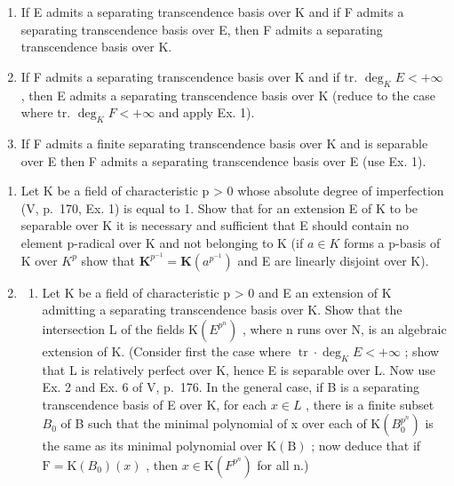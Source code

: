 \begin{enumerate}
\def\labelenumi{\alph{enumi})}
\item
  If E admits a separating transcendence basis over K and if F admits a separating transcendence basis over E, then F admits a separating transcendence basis over K.
\item
  If F admits a separating transcendence basis over K and if tr. \(\deg_{K}E<+\infty\) , then E admits a separating transcendence basis over K (reduce to the case where tr. \(\deg_{K}F<+\infty\) and apply Ex. 1).
\item
  If F admits a finite separating transcendence basis over K and is separable over E then F admits a separating transcendence basis over E (use Ex. 1).
\end{enumerate}

\begin{enumerate}
\def\labelenumi{\arabic{enumi})}
\setcounter{enumi}{3}
\item
  Let K be a field of characteristic p \textgreater{} 0 whose absolute degree of imperfection (V, p.~170, Ex. 1) is equal to 1. Show that for an extension E of K to be separable over K it is necessary and sufficient that E should contain no element p-radical over K and not belonging to K (if \(a \in K\) forms a p-basis of K over \(K^{p}\) show that \(\mathbf{K}^{p^{-1}} = \mathbf{K}(a^{p^{-1}})\) and E are linearly disjoint over K).
\item
  \begin{enumerate}
  \def\labelenumii{\alph{enumii})}
  \tightlist
  \item
    Let K be a field of characteristic p \textgreater{} 0 and E an extension of K admitting a separating transcendence basis over K. Show that the intersection L of the fields \(\mathrm{K}(E^{p^{n}})\) , where n runs over N, is an algebraic extension of K. (Consider first the case where \(\operatorname{tr} \cdot \deg_{K} E < +\infty\) ; show that L is relatively perfect over K, hence E is separable over L. Now use Ex. 2 and Ex. 6 of V, p.~176. In the general case, if B is a separating transcendence basis of E over K, for each \(x \in L\) , there is a finite subset \(B_{0}\) of B such that the minimal polynomial of x over each of \(\mathrm{K}(B_{0}^{p^{n}})\) is the same as its minimal polynomial over \(\mathrm{K(B)}\) ; now deduce that if \(\mathrm{F} = \mathrm{K}(B_{0})(x)\) , then \(x \in \mathrm{K}(F^{p^{n}})\) for all n.)
  \end{enumerate}
\end{enumerate}

